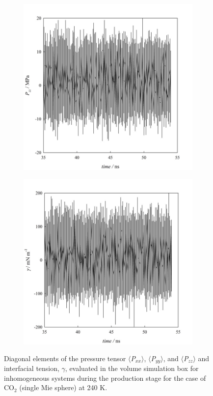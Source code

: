 \documentclass[9pt,bestpractices]{livecoms}
\begin{document}
\begin{figure}
\begin{subfigure}{0.2\textwidth}
	\end{subfigure}
	\begin{subfigure}{0.2\textwidth} %
    \includegraphics[width=1\textwidth]{gfx/image58.jpeg}
	\end{subfigure}
	\begin{subfigure}{0.2\textwidth} %
    \includegraphics[width=1\textwidth]{gfx/image59.jpeg}
	\end{subfigure}
\caption{Diagonal elements of the pressure tensor ${\langle}$\textit{P}$_{xx}$${\rangle}$, ${\langle}$\textit{P}$_{yy}$${\rangle}$, and ${\langle}$\textit{P}$_{zz}$${\rangle}$ and interfacial tension, ${\gamma}$, evaluated in the volume simulation box for inhomogeneous systems during the production stage for the case of CO$_{2}$ (single Mie sphere) at 240 K.
}
\label{fig:16}
\end{figure}
\end{document}
